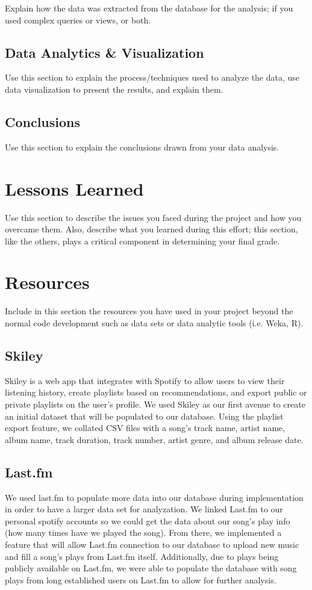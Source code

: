 \documentclass[12pt]{article}
\begin{document}
    Explain how the data was extracted from the database for the analysis; if you used complex queries or views, or both.
    \subsection{Data Analytics \& Visualization}
    Use this section to explain the process/techniques used to analyze the data, use data visualization to present the results, and explain them.
    \subsection{Conclusions}
    Use this section to explain the conclusions drawn from your data analysis.\\
    \section{Lessons Learned}
    Use this section to describe the issues you faced during the project and how you overcame them. Also, describe what you learned during this effort; this section, like the others, plays a critical component in determining your final grade.\\


    \section{Resources}
    Include in this section the resources you have used in your project beyond the normal code development
    such as data sets or data analytic tools (i.e. Weka, R).

    \subsection{Skiley}
    Skiley is a web app that integrates with Spotify to allow users to view their listening history,
    create playlists based on recommendations, and export public or private playlists on the user's profile.
    We used Skiley as our first avenue to create an initial dataset that will be populated to our database.
    Using the playlist export feature, we collated CSV files with a song's track name, artist name, album name,
    track duration, track number, artist genre, and album release date.

    \subsection{Last.fm}
    We used last.fm to populate more data into our database during implementation
    in order to have a larger data set for analyzation. We linked Last.fm to our
    personal spotify accounts so we could get the data about our song's play info
    (how many times have we played the song). From there, we implemented a feature
    that will allow Last.fm connection to our database to upload new music and fill
    a song's plays from Last.fm itself. Additionally, due to plays being publicly
    available on Last.fm, we were able to populate the database with song plays from
    long established users on Last.fm to allow for further analysis.
\end{document}

